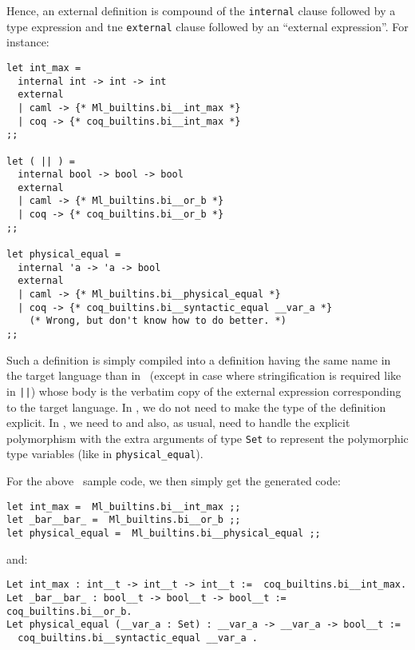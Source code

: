 Hence, an external definition is compound of the {\tt internal} clause
followed by a type expression and tne {\tt external} clause followed
by an ``external expression''. For instance:

{\footnotesize
\begin{lstlisting}[title=External value definitions]
let int_max =
  internal int -> int -> int
  external
  | caml -> {* Ml_builtins.bi__int_max *}
  | coq -> {* coq_builtins.bi__int_max *}
;;

let ( || ) =
  internal bool -> bool -> bool
  external
  | caml -> {* Ml_builtins.bi__or_b *}
  | coq -> {* coq_builtins.bi__or_b *}
;;

let physical_equal =
  internal 'a -> 'a -> bool
  external
  | caml -> {* Ml_builtins.bi__physical_equal *}
  | coq -> {* coq_builtins.bi__syntactic_equal __var_a *}
    (* Wrong, but don't know how to do better. *)
;;
\end{lstlisting}}

Such a definition is simply compiled into a definition having the same
name in the target language than in \focalize\ (except in case where
stringification is required like in {\tt ||}) whose body is the
verbatim copy of the external expression corresponding to the target
language. In \ocaml, we do not need to make the type of the definition
explicit. In \coq, we need to and also, as usual, need to handle the
explicit polymorphism with the extra arguments of type {\tt Set} to
represent the polymorphic type variables (like in
{\tt physical\_equal}).

For the above \focalize\ sample code, we then simply get the generated
code:

{\footnotesize
\begin{lstlisting}[language=MyOCaml,
                   title=\ocaml\ code for external value definitions]
let int_max =  Ml_builtins.bi__int_max ;;
let _bar__bar_ =  Ml_builtins.bi__or_b ;;
let physical_equal =  Ml_builtins.bi__physical_equal ;;
\end{lstlisting}}

\noindent and:

{\footnotesize
\begin{lstlisting}[language=MyCoq,
                   title=\coq code for external value definitions]
Let int_max : int__t -> int__t -> int__t :=  coq_builtins.bi__int_max.
Let _bar__bar_ : bool__t -> bool__t -> bool__t := coq_builtins.bi__or_b.
Let physical_equal (__var_a : Set) : __var_a -> __var_a -> bool__t :=
  coq_builtins.bi__syntactic_equal __var_a .
\end{lstlisting}}


